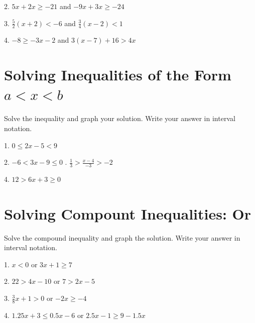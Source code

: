\documentclass[12pt]{article}
\begin{document}
\vspace{4.5em} 

2. $5x+2x\geq -21$ and $-9x+3x\geq -24$ 

\vspace{4.5em} 

3. $\frac{5}{2}(x+2)<-6 $ and $\frac{3}{4}(x-2)<1 $ 

\vspace{4.5em} 

4. $-8\geq -3x-2$ and $3(x-7)+16>4x$ 

\vspace{4.5em}

\section{Solving Inequalities of the Form $a<x<b$}

Solve the inequality and graph your solution. Write your answer in interval notation. 

\vspace{1.5em}

1. $0\leq 2x-5<9$ 

\vspace{4.5em} 

2. $-6<3x-9\leq 0$ 
. $\frac{1}{3}>\frac{x-4}{-3}>-2   $ 

\vspace{4.5em} 

4. $12>6x+3\geq 0$

\vspace{4.5em} 
\section{Solving Compount Inequalities: Or}

Solve the compound inequality and graph the solution. Write your answer in interval notation. 

\vspace{1.5em}

1. $x<0$ or $3x+1\geq 7$ 

\vspace{4.5em} 

2. $22>4x-10$ or $7>2x-5$ 

\vspace{4.5em} 

3. $\frac{3}{8}x+1>0 $ or $-2x\geq -4$ 

\vspace{4.5em} 

4. $1.25x+3\leq 0.5x-6$ or $2.5x-1\geq 9-1.5x$
\end{document}
